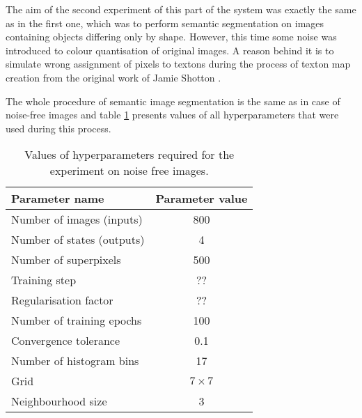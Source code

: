 The aim of the second experiment of this part of the system was exactly the same as in the first one, which was to perform semantic segmentation on images containing objects differing only by shape. However, this time some noise was introduced to colour quantisation of original images. A reason behind it is to simulate wrong assignment of pixels to textons during the process of texton map creation from the original work of Jamie Shotton \cite{article_main}. 

The whole procedure of semantic image segmentation is the same as in case of noise-free images and table \ref{table:hyperparameters_nonlinear_noised} presents values of all hyperparameters that were used during this process.
\begin{table}[ht]
    \caption{Values of hyperparameters required for the experiment on noise free images.}
    \centering
    \begin{tabular}{|l|c|}
        \hline
        \rowcolor[HTML]{C0C0C0} 
        \textbf{Parameter name} & \textbf{Parameter value} \\ \hline
        Number of images (inputs) & 800 \\ \hline
        Number of states (outputs) & 4 \\ \hline
        Number of superpixels & 500 \\ \hline
        Training step & ?? \\ \hline
        Regularisation factor & ?? \\ \hline
        Number of training epochs & 100 \\ \hline
        Convergence tolerance & 0.1 \\ \hline
        Number of histogram bins & 17 \\ \hline
        Grid & $7 \times 7$ \\ \hline
        Neighbourhood size & 3 \\ \hline
    \end{tabular}
    \label{table:hyperparameters_nonlinear_noised}
\end{table}
